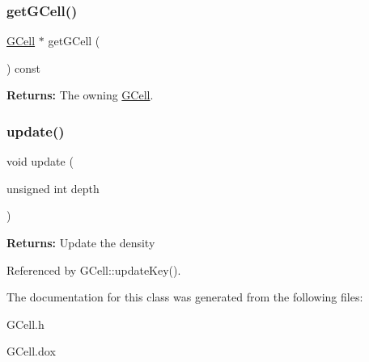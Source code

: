 \subsubsection{\texorpdfstring{get\+G\+Cell()}{getGCell()}}
{\footnotesize\ttfamily \mbox{\hyperlink{classKatabatic_1_1GCell}{G\+Cell}} $\ast$ get\+G\+Cell (\begin{DoxyParamCaption}{ }\end{DoxyParamCaption}) const\hspace{0.3cm}{\ttfamily [inline]}}

{\bfseries Returns\+:} The owning \mbox{\hyperlink{classKatabatic_1_1GCell}{G\+Cell}}. \mbox{\label{classKatabatic_1_1GCell_1_1Key_a1b9cfb06a645d2b0d93024bc6ff82e9e}} 
\subsubsection{\texorpdfstring{update()}{update()}}
{\footnotesize\ttfamily void update (\begin{DoxyParamCaption}\item[{unsigned int}]{depth }\end{DoxyParamCaption})\hspace{0.3cm}{\ttfamily [inline]}}

{\bfseries Returns\+:} Update the density 

Referenced by G\+Cell\+::update\+Key().



The documentation for this class was generated from the following files\+:\begin{DoxyCompactItemize}
\item 
G\+Cell.\+h\item 
G\+Cell.\+dox\end{DoxyCompactItemize}
